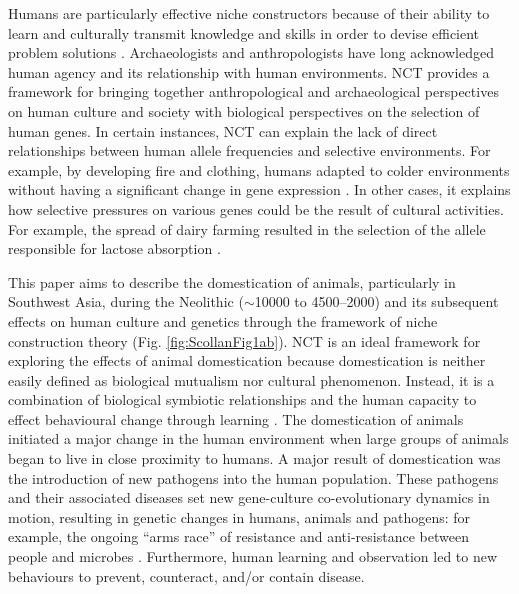 	Humans are particularly effective niche constructors because of their ability to learn and culturally transmit knowledge and skills in order to devise efficient problem solutions \parencite{Richerson_2005}. 
Archaeologists and anthropologists have long acknowledged human agency and its relationship with human environments. NCT provides a framework for bringing together anthropological and archaeological perspectives on human culture and society with biological perspectives on the selection of human genes. 
In certain instances, NCT can explain the lack of direct relationships between human allele frequencies and selective environments. For example, by developing fire and clothing, humans adapted to colder environments without having a significant change in gene expression \parencite[140--141]{Laland_2010b}. 
In other cases, it explains how selective pressures on various genes could be the result of cultural activities. For example, the spread of dairy farming resulted in the selection of the allele responsible for lactose absorption \parencites[3738]{Burger_2007}{Feldman_1989}{Holden_1997}.

This paper aims to describe the domestication of animals, particularly in Southwest Asia, during the Neolithic ($\sim$10000 to 4500--2000\BC) 
and its subsequent effects on human culture and genetics through the framework of niche construction theory (Fig. \ref{fig:ScollanFig1ab}). 
NCT is an ideal framework for exploring the effects of animal domestication because domestication is neither easily defined as biological mutualism nor cultural phenomenon. 
Instead, it is a combination of biological symbiotic relationships 
and the human capacity to effect behavioural change through learning \parencite[111--115]{Zeder_2006a}. 
The domestication of animals initiated a major change in the human environment when large groups of animals began to live in close proximity to humans. 
A major result of domestication was the introduction of new pathogens into the human population. 
These pathogens and their associated diseases set new gene-culture co-evolutionary dynamics in motion, resulting in genetic changes in humans, animals and pathogens: for example, the ongoing “arms race” of resistance and anti-resistance between people and microbes \parencite{Boni_2005}. 
Furthermore, human learning and observation led to new behaviours to prevent, counteract, and/or contain disease.

